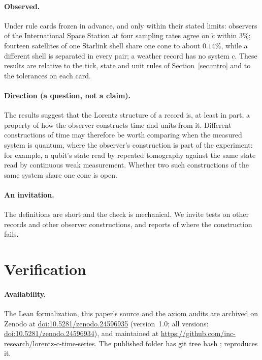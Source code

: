 \documentclass[11pt]{article}
\theoremstyle{definition}
\theoremstyle{plain}
\theoremstyle{remark}
\begin{document}
\paragraph{Observed.} Under rule cards frozen in advance, and only within their stated limits: observers of the International Space Station at four sampling rates agree on $\tilde c$ within $3\%$; fourteen satellites of one Starlink shell share one cone to about $0.14\%$, while a different shell is separated in every pair; a weather record has no system $c$. These results are relative to the tick, state and unit rules of Section~\ref{sec:intro} and to the tolerances on each card.

\paragraph{Direction (a question, not a claim).} The results suggest that the Lorentz structure of a record is, at least in part, a property of how the observer constructs time and units from it. Different constructions of time may therefore be worth comparing when the measured system is quantum, where the observer's construction is part of the experiment: for example, a qubit's state read by repeated tomography against the same state read by continuous weak measurement. Whether two such constructions of the same system share one cone is open.

\paragraph{An invitation.} The definitions are short and the check is mechanical. We invite tests on other records and other observer constructions, and reports of where the construction fails.

\section{Verification}\label{sec:verify}

{\sloppy\paragraph{Availability.} The Lean formalization, this paper's source and the axiom audits are archived on Zenodo at \href{https://doi.org/10.5281/zenodo.24596935}{doi:10.5281/zenodo.24596935} (version~1.0; all versions: \href{https://doi.org/10.5281/zenodo.24596934}{doi:10.5281/zenodo.24596934}), and maintained at \url{https://github.com/inc-research/lorentz-c-time-series}. The published  folder has git tree hash ;  reproduces it.\par}
\end{document}
